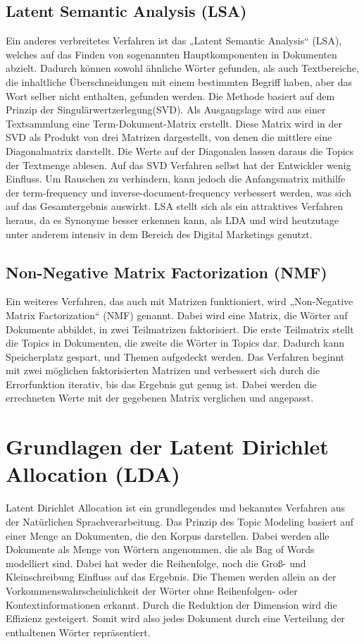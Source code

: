 \documentclass[german,version-2020-11]{uzl-thesis}
\begin{document}
\subsection{Latent Semantic Analysis (LSA)}
Ein anderes verbreitetes Verfahren ist das „Latent Semantic Analysis“ (LSA), welches auf das Finden von sogenannten Hauptkomponenten in Dokumenten abzielt. Dadurch können sowohl ähnliche Wörter gefunden, als auch Textbereiche, die inhaltliche Überschneidungen mit einem bestimmten Begriff haben, aber das Wort selber nicht enthalten, gefunden werden. Die Methode basiert auf dem Prinzip der Singulärwertzerlegung(SVD). Als Ausgangslage wird aus einer Textsammlung eine Term-Dokument-Matrix erstellt. Diese Matrix wird in der SVD als Produkt von drei Matrizen dargestellt, von denen die mittlere eine Diagonalmatrix darstellt. Die Werte auf der Diagonalen lassen daraus die Topics der Textmenge ablesen. Auf das SVD Verfahren selbst hat der Entwickler wenig Einfluss. Um Rauschen zu verhindern, kann jedoch die Anfangsmatrix mithilfe der term-frequency und inverse-document-frequency verbessert werden, was sich auf das Gesamtergebnis auswirkt. LSA stellt sich als ein attraktives Verfahren heraus, da es Synonyme besser erkennen kann, als LDA und wird heutzutage unter anderem intensiv in dem Bereich des Digital Marketings genutzt.

\subsection{Non-Negative Matrix Factorization (NMF)}
Ein weiteres Verfahren, das auch mit Matrizen funktioniert, wird „Non-Negative Matrix Factorization“ (NMF) genannt. Dabei wird eine Matrix, die Wörter auf Dokumente abbildet, in zwei Teilmatrizen faktorisiert. Die erste Teilmatrix stellt die Topics in Dokumenten, die zweite die Wörter in Topics dar. Dadurch kann Speicherplatz gespart, und Themen aufgedeckt werden. Das Verfahren beginnt mit zwei möglichen faktorisierten Matrizen und verbessert sich durch die Errorfunktion iterativ, bis das Ergebnis gut genug ist. Dabei werden die errechneten Werte mit der gegebenen Matrix verglichen und angepasst.


\section{Grundlagen der Latent Dirichlet Allocation (LDA)}
Latent Dirichlet Allocation ist ein grundlegendes und bekanntes Verfahren aus der Natürlichen Sprachverarbeitung. Das Prinzip des Topic Modeling basiert auf einer Menge an Dokumenten, die den Korpus darstellen. Dabei werden alle Dokumente als Menge von Wörtern angenommen, die als Bag of Words modelliert sind. Dabei hat weder die Reihenfolge, noch die Groß- und Kleinschreibung Einfluss auf das Ergebnis. Die Themen werden  allein an der Vorkommenswahrscheinlichkeit der Wörter ohne Reihenfolgen- oder Kontextinformationen erkannt. Durch die Reduktion der Dimension wird die Effizienz gesteigert. Somit wird also jedes Dokument durch eine Verteilung der enthaltenen Wörter repräsentiert.\\
\end{document}
